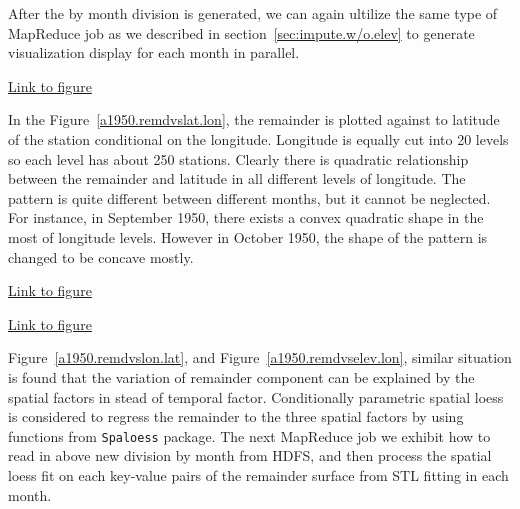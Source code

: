 After the by month division is generated, we can again ultilize the same type of 
MapReduce job as we described in section~\ref{sec:impute.w/o.elev} to generate 
visualization display for each month in parallel.

\begin{framed}
\begin{center}
  \href{../plots/a1950/spafit/a1950.remainder.vs.lat.lon.pdf}
  {Link to figure}
  \label{a1950.remdvslat.lon}
\end{center}
\end{framed}

In the Figure~\href{../plots/a1950/spafit/a1950.remainder.vs.lat.lon.pdf}
{\ref*{a1950.remdvslat.lon}}, the remainder is plotted against to latitude of the
station conditional on the longitude. Longitude is equally cut into 20 levels so
each level has about 250 stations. Clearly there is quadratic relationship 
between the remainder and latitude in all different levels of longitude. The 
pattern is quite different between different months, but it cannot be neglected.
For instance, in September 1950, there exists a convex quadratic shape in the 
most of longitude levels. However in October 1950, the shape of the pattern is
changed to be concave mostly.

\begin{framed}
\begin{center}
  \href{../plots/a1950/spafit/a1950.remainder.vs.lon.lat.pdf}
  {Link to figure}
  \label{a1950.remdvslon.lat}
\end{center}
\end{framed}

\begin{framed}
\begin{center}
  \href{../plots/a1950/spafit/a1950.remainder.vs.elev.lon.pdf}
  {Link to figure}
  \label{a1950.remdvselev.lon}
\end{center}
\end{framed}


Figure~\href{../plots/a1950/spafit/a1950.remainder.vs.lon.lat.pdf}
{\ref*{a1950.remdvslon.lat}}, and
Figure~\href{../plots/a1950/spafit/a1950.remainder.vs.elev.lon.pdf}
{\ref*{a1950.remdvselev.lon}}, similar situation is found that the variation of 
remainder component can be explained by the spatial factors in stead of temporal
factor. Conditionally parametric spatial loess is considered to regress the 
remainder to the three spatial factors by using functions from \texttt{Spaloess} 
package. The next MapReduce job we exhibit how to read in above new division by 
month from HDFS, and then process the spatial loess fit on each key-value pairs 
of the remainder surface from STL fitting in each month.


